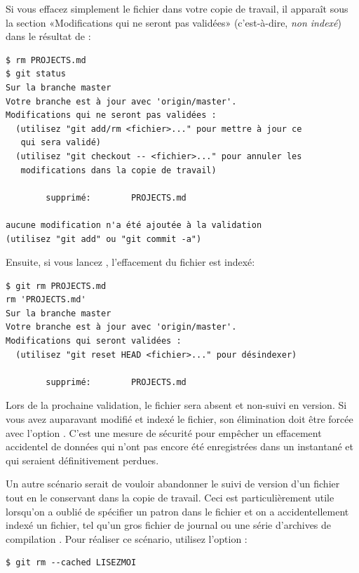 Si vous effacez simplement le fichier dans votre copie de travail, il apparaît sous la section «Modifications qui ne seront pas validées» (c'est-à-dire, \emph{non indexé}) dans le résultat de :
\begin{Schunk}
\begin{Verbatim}
$ rm PROJECTS.md
$ git status
Sur la branche master
Votre branche est à jour avec 'origin/master'.
Modifications qui ne seront pas validées :
  (utilisez "git add/rm <fichier>..." pour mettre à jour ce
   qui sera validé)
  (utilisez "git checkout -- <fichier>..." pour annuler les
   modifications dans la copie de travail)

        supprimé:        PROJECTS.md

aucune modification n'a été ajoutée à la validation
(utilisez "git add" ou "git commit -a")
\end{Verbatim}
\end{Schunk}

Ensuite, si vous lancez , l'effacement du fichier est indexé:
\begin{Schunk}
\begin{Verbatim}
$ git rm PROJECTS.md
rm 'PROJECTS.md'
Sur la branche master
Votre branche est à jour avec 'origin/master'.
Modifications qui seront validées :
  (utilisez "git reset HEAD <fichier>..." pour désindexer)

        supprimé:        PROJECTS.md
\end{Verbatim}
\end{Schunk}

Lors de la prochaine validation, le fichier sera absent et non-suivi en version.
Si vous avez auparavant modifié et indexé le fichier, son élimination doit être forcée avec l'option .
C'est une mesure de sécurité pour empêcher un effacement accidentel de données qui n'ont pas encore été enregistrées dans un instantané et qui seraient définitivement perdues.

Un autre scénario serait de vouloir abandonner le suivi de version d'un fichier tout en le conservant dans la copie de travail.
Ceci est particulièrement utile lorsqu'on a oublié de spécifier un patron dans le fichier  et on a accidentellement indexé un fichier, tel qu'un gros fichier de journal ou une série d'archives de compilation .
Pour réaliser ce scénario, utilisez l'option :
\begin{Schunk}
\begin{Verbatim}
$ git rm --cached LISEZMOI
\end{Verbatim}
\end{Schunk}

